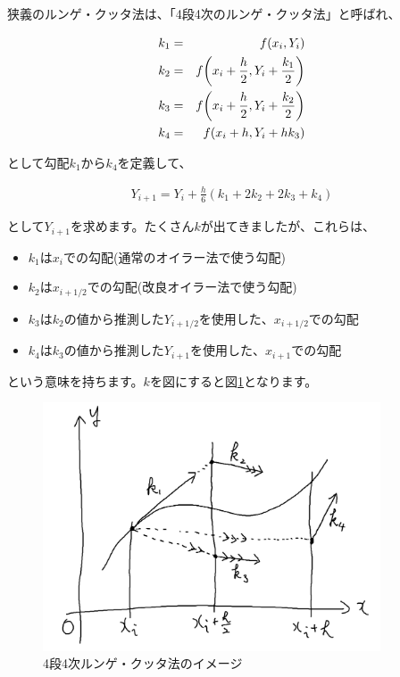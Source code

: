 狭義のルンゲ・クッタ法は、「4段4次のルンゲ・クッタ法」と呼ばれ、

\begin{eqnarray}
    k_1&=&f(x_i,Y_i) \\
    k_2&=&f\pqty{x_i+\frac{h}{2},Y_i+\frac{k_1}{2}} \\
    k_3&=&f\pqty{x_i+\frac{h}{2},Y_i+\frac{k_2}{2}} \\
    k_4&=&f(x_i+h,Y_i+hk_3)
\end{eqnarray}

\noindent
として勾配$k_1$から$k_4$を定義して、

\begin{eqnarray}
    Y_{i+1}=Y_i+\frac{h}{6}(k_1+2k_2+2k_3+k_4)
    \label{eq:runge-kutta}
\end{eqnarray}

\noindent
として$Y_{i+1}$を求めます。たくさん$k$が出てきましたが、これらは、

\clearpage

\begin{itemize}
    \item $k_1$は$x_i$での勾配(通常のオイラー法で使う勾配)
    \item $k_2$は$x_{i+1/2}$での勾配(改良オイラー法で使う勾配)
    \item $k_3$は$k_2$の値から推測した$Y_{i+1/2}$を使用した、$x_{i+1/2}$での勾配
    \item $k_4$は$k_3$の値から推測した$Y_{i+1}$を使用した、$x_{i+1}$での勾配
\end{itemize}

\noindent
という意味を持ちます。$k$を図にすると図\ref{fig:4-runge-kutta}となります。

\begin{figure}[ht!]
  \centering
  \includegraphics[width=10cm]{img/4-runge-kutta.png}
  \caption{4段4次ルンゲ・クッタ法のイメージ}
  \label{fig:4-runge-kutta}
\end{figure}

